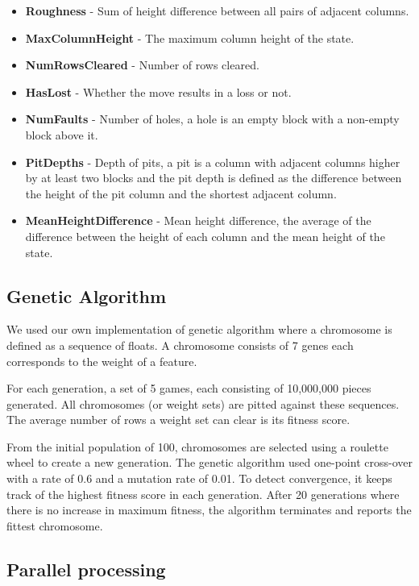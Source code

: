 \documentclass[twocolumn,12pt,journal,final]{IEEEtran_modified}
\begin{document}
\begin{itemize}
  \item \textbf{Roughness} - Sum of height difference between all pairs of adjacent columns.
  \item \textbf{MaxColumnHeight} - The maximum column height of the state.
  \item \textbf{NumRowsCleared} - Number of rows cleared.
  \item \textbf{HasLost} - Whether the move results in a loss or not.
  \item \textbf{NumFaults} - Number of holes, a hole is an empty block with a non-empty block above it.
  \item \textbf{PitDepths} - Depth of pits, a pit is a column with adjacent columns higher by at least two blocks and the pit depth is defined as the difference between the height of the pit column and the shortest adjacent column.
  \item \textbf{MeanHeightDifference} - Mean height difference, the average of the difference between the height of each column and the mean height of the state. 
\end{itemize}

\subsection{Genetic Algorithm}
We used our own implementation of genetic algorithm where a chromosome is defined as a sequence of floats. A chromosome consists of 7 genes each corresponds to the weight of a feature.

For each generation, a set of 5 games, each consisting of 10,000,000 pieces generated. All chromosomes (or weight sets) are pitted against these sequences. The average number of rows a weight set can clear is its fitness score.

From the initial population of 100, chromosomes are selected using a roulette wheel to create a new generation. The genetic algorithm used one-point cross-over with a rate of 0.6 and a mutation rate of 0.01. To detect convergence, it keeps track of the highest fitness score in each generation. After 20 generations where there is no increase in maximum fitness, the algorithm terminates and reports the fittest chromosome.

\subsection{Parallel processing}
\end{document}
